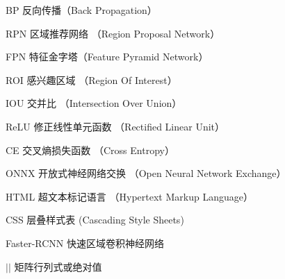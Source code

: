 
\begin{denotation}[3cm]
  \item[BP] 反向传播（Back Propagation）
  \item[RPN] 区域推荐网络 （Region Proposal Network）
  \item[FPN] 特征金字塔（Feature Pyramid Network）
  \item[ROI] 感兴趣区域 （Region Of Interest）
  \item[IOU] 交并比 （Intersection Over Union）
  \item[ReLU] 修正线性单元函数 （Rectified Linear Unit）
  \item[CE] 交叉熵损失函数 （Cross Entropy）
  \item[ONNX] 开放式神经网络交换 （Open Neural Network Exchange）
  \item[HTML] 超文本标记语言 （Hypertext Markup Language）
  \item[CSS] 层叠样式表 (Cascading Style Sheets)
  \item[Faster-RCNN] 快速区域卷积神经网络
  \item[$\left| {} \right|$] 矩阵行列式或绝对值
\end{denotation}




